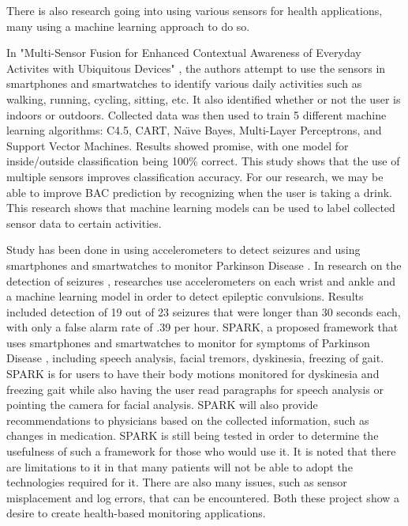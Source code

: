 There is also research going into using various sensors for health applications, many using a machine learning approach to do so. 

In "Multi-Sensor Fusion for Enhanced Contextual Awareness of Everyday Activites with Ubiquitous Devices" \cite{Guiry:2014}, the authors attempt to use the sensors in smartphones and smartwatches to identify various daily activities such as walking, running, cycling, sitting, etc. It also identified whether or not the user is indoors or outdoors. Collected data was then used to train 5 different machine learning algorithms: C4.5, CART, Na\"{\i}ve Bayes, Multi-Layer Perceptrons, and Support Vector Machines. Results showed promise, with one model for inside/outside classification being 100\% correct. This study shows that the use of multiple sensors improves classification accuracy. For our research, we may be able to improve BAC prediction by recognizing when the user is taking a drink. This research shows that machine learning models can be used to label collected sensor data to certain activities.

Study has been done in using accelerometers to detect seizures \cite{Milosevic:2014} and using smartphones and smartwatches to monitor Parkinson Disease \cite{Sharma:2014}. In research on the detection of seizures \cite{Milosevic:2014}, researches use accelerometers on each wrist and ankle and a machine learning model in order to detect epileptic convulsions. Results included detection of 19 out of 23 seizures that were longer than 30 seconds each, with only a false alarm rate of .39 per hour. SPARK, a proposed framework that uses smartphones and smartwatches to monitor for symptoms of Parkinson Disease \cite{Sharma:2014}, including speech analysis, facial tremors, dyskinesia, freezing of gait. SPARK is for users to have their body motions monitored for dyskinesia and freezing gait while also having the user read paragraphs for speech analysis or pointing the camera for facial analysis. SPARK will also provide recommendations to physicians based on the collected information, such as changes in medication. SPARK is still being tested in order to determine the usefulness of such a framework for those who would use it. It is noted that there are limitations to it in that many patients will not be able to adopt the technologies required for it. There are also many issues, such as sensor misplacement and log errors, that can be encountered. Both these project show a desire to create health-based monitoring applications. 

